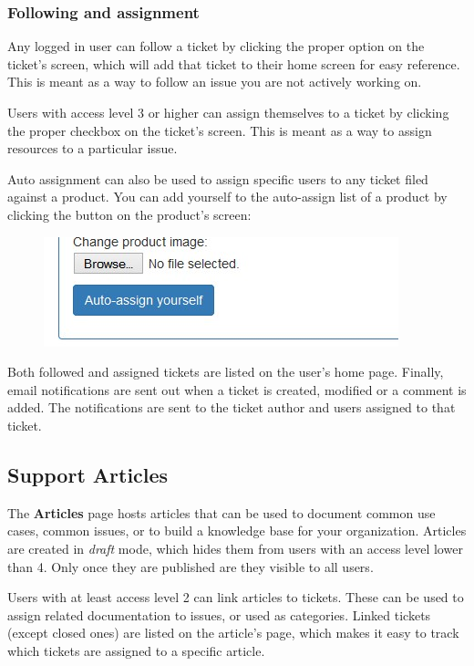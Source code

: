 \documentclass[11pt]{article}
\begin{document}
\subsubsection{Following and assignment}
Any logged in user can follow a ticket by clicking the proper option on the ticket's screen, which will add that ticket to their home screen for easy reference. This is meant as a way to follow an issue you are not actively working on.

Users with access level 3 or higher can assign themselves to a ticket by clicking the proper checkbox on the ticket's screen. This is meant as a way to assign resources to a particular issue.

Auto assignment can also be used to assign specific users to any ticket filed against a product. You can add yourself to the auto-assign list of a product by clicking the button on the product's screen:

\begin{figure}[h]
\includegraphics{autoassign.jpg}
\end{figure}

Both followed and assigned tickets are listed on the user's home page. Finally, email notifications are sent out when a ticket is created, modified or a comment is added. The notifications are sent to the ticket author and users assigned to that ticket.

\subsection{Support Articles}
The \textbf{Articles} page hosts articles that can be used to document common use cases, common issues, or to build a knowledge base for your organization. Articles are created in \textit{draft} mode, which hides them from users with an access level lower than 4. Only once they are published are they visible to all users.

Users with at least access level 2 can link articles to tickets. These can be used to assign related documentation to issues, or used as categories. Linked tickets (except closed ones) are listed on the article's page, which makes it easy to track which tickets are assigned to a specific article.
\end{document}
